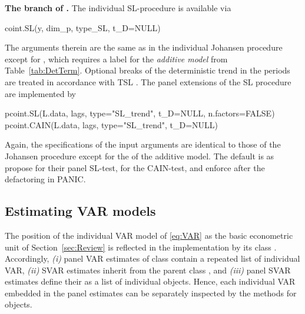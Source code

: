 \textbf{The branch of \citeauthor{SaikkonenLutkepohl2000}.} The individual SL-procedure is available via
\begin{CodeChunk}
\begin{CodeInput}
coint.SL(y, dim_p, type_SL, t_D=NULL)
\end{CodeInput}
\end{CodeChunk}
The arguments therein are the same as in the individual Johansen procedure except for , which requires a label for the \textit{additive model} from Table~\ref{tab:DetTerm}. Optional breaks of the deterministic trend in the periods  are treated in accordance with TSL \citeyearpar{TrenklerEtAl2008}. The panel extensions of the SL procedure are implemented by
\begin{CodeChunk}
\begin{CodeInput}
pcoint.SL(L.data,   lags, type="SL_trend", t_D=NULL, n.factors=FALSE)
pcoint.CAIN(L.data, lags, type="SL_trend", t_D=NULL)
\end{CodeInput}
\end{CodeChunk}
Again, the specifications of the input arguments are identical to those of the Johansen procedure  except for the  of the additive model. The default is  as \citet{OersalDroge2014} propose for their panel SL-test, \citet{ArsovaOersal2021} for the CAIN-test, and \citeauthor{OersalArsova2017} \citeyearpar{OersalArsova2017,ArsovaOersal2018} enforce after the defactoring in PANIC.


\subsection{Estimating VAR models} \label{sec:pvarx}
The position of the individual VAR model of \eqref{eq:VAR} as the basic econometric unit of Section~\ref{sec:Review} is reflected in the  implementation by its class . Accordingly, \textit{(i)} panel VAR estimates of class  contain a repeated list  of individual VAR, \textit{(ii)} SVAR estimates  inherit from the parent class , and \textit{(iii)} panel SVAR estimates  define their  as a list of individual  objects. Hence, each individual VAR embedded in the panel estimates can be separately inspected by the methods for  objects.

